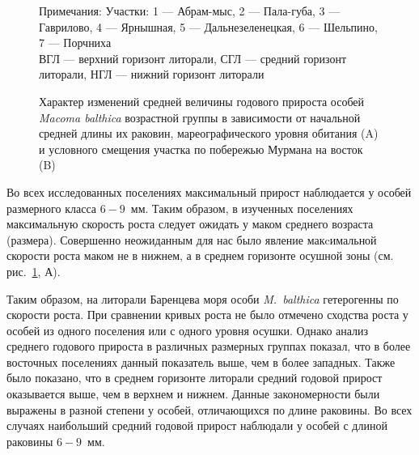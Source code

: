 \begin{figure}[p]
\begin{minipage}[b]{.5\linewidth}
\begin{center}
			\end{center}
		\end{minipage}
	\caption{Характер изменений средней величины годового прироста особей {\it Macoma balthica} возрастной группы в зависимости от начальной средней длины их раковин, мареографического уровня обитания (A) и условного смещения участка по побережью Мурмана на восток (B)}
\footnotesize{Примечания: Участки: 1 --- Абрам-мыс, 2 --- Пала-губа, 3 --- Гаврилово, 4 --- Ярнышная, 5 --- Дальнезеленецкая, 6 --- Шельпино, 7 --- Порчниха\\
ВГЛ --- верхний горизонт литорали, СГЛ --- средний горизонт литорали, НГЛ --- нижний горизонт литорали}
	\label{ris:prirost_otklik}
	\end{figure}
Во всех исследованных поселениях максимальный прирост наблюдается у особей размерного класса $6 - 9$~мм. 
Таким образом, в изученных поселениях максимальную скорость роста следует ожидать у маком среднего возраста (размера). 
Совершенно неожиданным для нас было явление макcимальной скорости роста маком не в нижнем, а в среднем горизонте осушной зоны (см. рис.~\ref{ris:prirost_otklik}, А). 

\bigskip
Таким образом, на литорали Баренцева моря особи \textit{M.~balthica} гетерогенны по скорости роста.
При сравнении кривых роста не было отмечено сходства роста у особей из одного поселения или с одного уровня осушки. 
Однако анализ среднего годового прироста в различных размерных группах показал, что в более восточных поселениях данный показатель выше, чем в более западных.
Также было показано, что в среднем горизонте литорали средний годовой прирост оказывается выше, чем в верхнем и нижнем.
Данные закономерности были выражены в разной степени у особей, отличающихся по длине раковины.
Во всех случаях наибольший средний годовой прирост наблюдали у особей с длиной раковины $6 - 9$~мм.

\afterpage{\clearpage}
